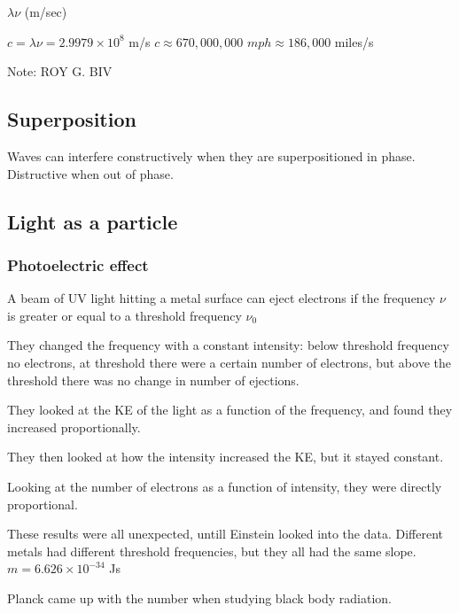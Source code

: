 \begin{definition}[Speed]
	$\lambda \nu$ (m/sec)
\end{definition}
\begin{constant}
	$c = \lambda \nu = 2.9979 \times 10^{8}$ m/s
	$c \approx 670,000,000 $ $mph \approx 186,000 $ miles/s
\end{constant}

Note: ROY G. BIV

\subsection{Superposition}%
\label{sub:superposition}

Waves can interfere constructively when they are superpositioned in phase.
Distructive when out of phase.

\subsection{Light as a particle}%
\label{sub:light_as_a_particle}

\subsubsection{Photoelectric effect}%
\label{ssub:photoelectric_effect}

A beam of UV light hitting a metal surface can eject electrons if the frequency
$\nu $ is greater or equal to a threshold frequency $\nu _{0}$

They changed the frequency with a constant intensity: below threshold frequency no
electrons, at threshold there were a certain number of electrons, but above the
threshold there was no change in number of ejections.

They looked at the KE of the light as a function of the frequency, and found they
increased proportionally.

They then looked at how the intensity increased the KE, but it stayed constant.

Looking at the number of electrons as a function of intensity, they were
directly proportional.

These results were all unexpected, untill Einstein looked into the data. Different metals
had different threshold frequencies, but they all had the same slope.  $ m = 6.626 \times 10^{-34}$ Js

Planck came up with the number when studying black body radiation.

